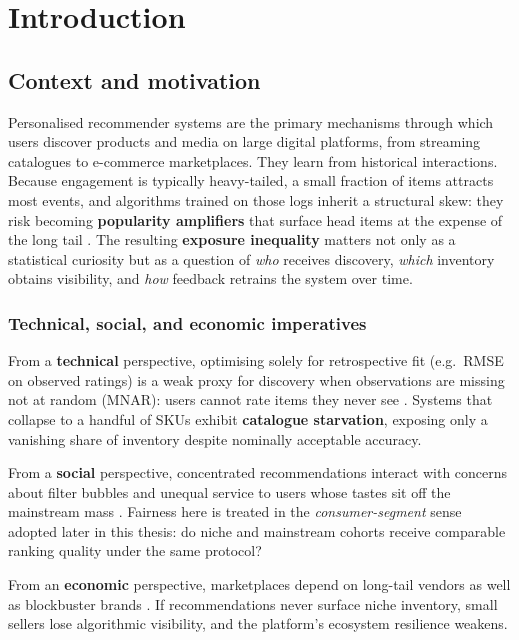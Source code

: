 \chapter{Introduction}
\label{ch:introduction}

\section{Context and motivation}
Personalised recommender systems are the primary mechanisms through which users discover products and media on large digital platforms, from streaming catalogues to e-commerce marketplaces. They learn from historical interactions. Because engagement is typically heavy-tailed, a small fraction of items attracts most events, and algorithms trained on those logs inherit a structural skew: they risk becoming \textbf{popularity amplifiers} that surface head items at the expense of the long tail \citep{abdollahpouri2019managing, steck2011itempopularity}. The resulting \textbf{exposure inequality} matters not only as a statistical curiosity but as a question of \emph{who} receives discovery, \emph{which} inventory obtains visibility, and \emph{how} feedback retrains the system over time.

\subsection{Technical, social, and economic imperatives}
From a \textbf{technical} perspective, optimising solely for retrospective fit (e.g.\ RMSE on observed ratings) is a weak proxy for discovery when observations are missing not at random (MNAR): users cannot rate items they never see \citep{marlin2009mnar, steck2010training}. Systems that collapse to a handful of SKUs exhibit \textbf{catalogue starvation}, exposing only a vanishing share of inventory despite nominally acceptable accuracy.

From a \textbf{social} perspective, concentrated recommendations interact with concerns about filter bubbles and unequal service to users whose tastes sit off the mainstream mass \citep{pariser2011filterbubble, abdollahpouri2021usercentered}. Fairness here is treated in the \emph{consumer-segment} sense adopted later in this thesis: do niche and mainstream cohorts receive comparable ranking quality under the same protocol?

From an \textbf{economic} perspective, marketplaces depend on long-tail vendors as well as blockbuster brands \citep{anderson2004long, brynjolfsson2006niches}. If recommendations never surface niche inventory, small sellers lose algorithmic visibility, and the platform's ecosystem resilience weakens.

